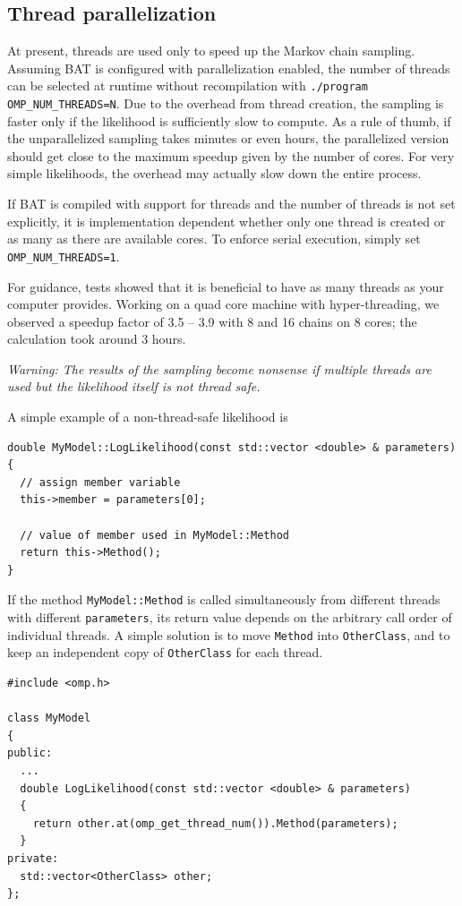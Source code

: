 \documentclass[11pt, a4paper]{article}
\begin{document}

\subsection{Thread parallelization}\label{subsection:thread-par}

At present, threads are used only to speed up the Markov chain
sampling.  Assuming BAT is configured with parallelization enabled,
the number of threads can be selected at runtime without recompilation
with \verb|./program OMP_NUM_THREADS=N|.  Due to the overhead from
thread creation, the sampling is faster only if the likelihood is
sufficiently slow to compute. As a rule of thumb, if the
unparallelized sampling takes minutes or even hours, the parallelized
version should get close to the maximum speedup given by the number of
cores. For very simple likelihoods, the overhead may actually slow
down the entire process.

If BAT is compiled with support for threads and the number of threads
is not set explicitly, it is implementation dependent whether only one
thread is created or as many as there are available cores. To enforce serial execution, simply set \verb|OMP_NUM_THREADS=1|.

For guidance, tests showed that it is beneficial to have as many threads as your
computer provides. Working on a quad core machine with hyper-threading, we
observed a speedup factor of 3.5 -- 3.9 with 8 and 16 chains on 8 cores; the
calculation took around 3 hours.

\emph{Warning: The results of the sampling become nonsense if multiple threads
are used but the likelihood itself is not thread safe.}

A simple example of a non-thread-safe likelihood is
\begin{verbatim}
double MyModel::LogLikelihood(const std::vector <double> & parameters)
{
  // assign member variable
  this->member = parameters[0];

  // value of member used in MyModel::Method
  return this->Method();
}
\end{verbatim}

If the method \texttt{MyModel::Method} is called simultaneously from
different threads with different \texttt{parameters}, its return value
depends on the arbitrary call order of individual threads.  A simple
solution is to move \texttt{Method} into \texttt{OtherClass}, and to
keep an independent copy of \texttt{OtherClass} for each thread.
\begin{verbatim}
#include <omp.h>

class MyModel
{
public:
  ...
  double LogLikelihood(const std::vector <double> & parameters)
  {
    return other.at(omp_get_thread_num()).Method(parameters);
  }
private:
  std::vector<OtherClass> other;
};

\end{verbatim}
\end{document}
